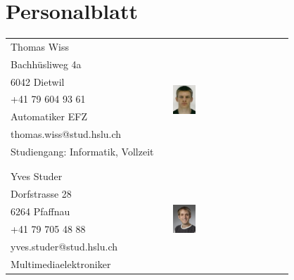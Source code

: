 
\section{Personalblatt}
  \begin{tabular}{lp{3.3cm}l}
    Thomas Wiss                                 & &  \multirow{8}{4cm}{\includegraphics[width=0.2\textwidth]{DasTeam/Bilder/ThomasWiss.jpg}} \\
    Bachhüsliweg 4a                             & &  \\
    6042 Dietwil                                & &  \\
    +41 79 604 93 61                            & &  \\
    Automatiker EFZ                             & &  \\
    thomas.wiss@stud.hslu.ch                 	& &  \\
    Studiengang: Informatik, Vollzeit           & &  \\
                                                & &  \\
                                                & &  \\
    Yves Studer                                 & &  \multirow{8}{4cm}{\includegraphics[width=0.2\textwidth]{DasTeam/Bilder/YvesStuder.jpg}} \\
    Dorfstrasse 28                              & &  \\
    6264 Pfaffnau                               & &  \\
    +41 79 705 48 88                            & &  \\
    yves.studer@stud.hslu.ch                    & &  \\
    Multimediaelektroniker                      & &  \\

\end{tabular}
